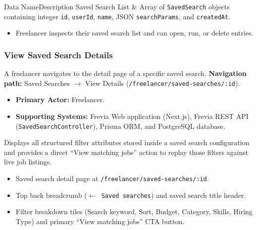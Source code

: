 \begin{specdatatable}{Data Name}{Description}
Saved Search List & Array of \texttt{SavedSearch} objects containing integer \texttt{id}, \texttt{userId}, \texttt{name}, JSON \texttt{searchParams}, and \texttt{createdAt}.\\ \hline
\end{specdatatable}

\begin{itemize}[leftmargin=1.6em,topsep=3pt,itemsep=2pt,parsep=0pt,label=$\bullet$]
    \item Freelancer inspects their saved search list and can open, run, or delete entries.
\end{itemize}

\subsubsection{View Saved Search Details}

A freelancer navigates to the detail page of a specific saved search.\newline
\textbf{Navigation path:} Saved Searches $\rightarrow$ View Details (\texttt{/freelancer/saved-searches/:id}).


\begin{itemize}[leftmargin=1.6em,topsep=3pt,itemsep=2pt,parsep=0pt,label=$\bullet$]
    \item \textbf{Primary Actor:} Freelancer.
    \item \textbf{Supporting Systems:} Frevia Web application (Next.js), Frevia REST API (\texttt{SavedSearchController}), Prisma ORM, and PostgreSQL database.
\end{itemize}

\noindent Displays all structured filter attributes stored inside a saved search configuration and provides a direct ``View matching jobs'' action to replay those filters against live job listings.

\begin{itemize}[leftmargin=1.6em,topsep=3pt,itemsep=2pt,parsep=0pt,label=$\bullet$]
    \item Saved search detail page at \texttt{/freelancer/saved-searches/:id}.
    \item Top back breadcrumb (\texttt{$\leftarrow$ Saved searches}) and saved search title header.
    \item Filter breakdown tiles (Search keyword, Sort, Budget, Category, Skills, Hiring Type) and primary ``View matching jobs'' CTA button.
\end{itemize}

